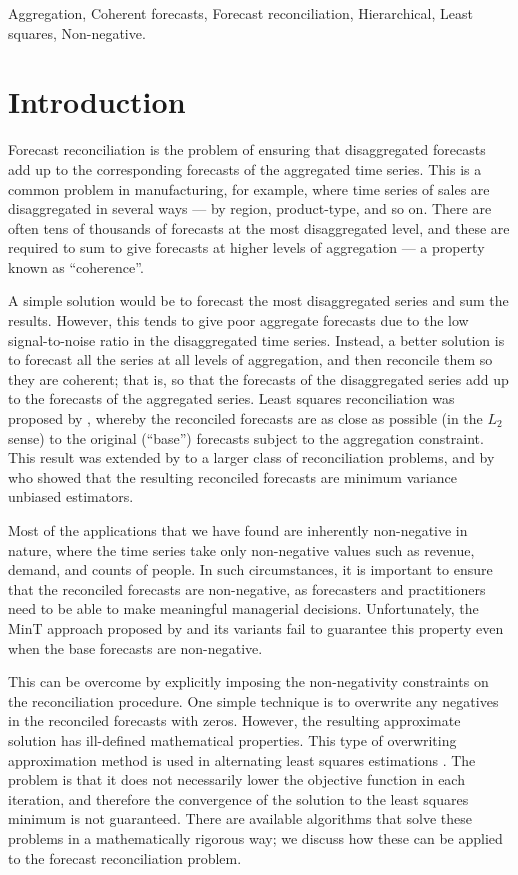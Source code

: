 \documentclass[11pt]{article}
\newcommand{\0}{\phantom{0}}
\begin{document}
\begin{keywords}
	Aggregation, Coherent forecasts, Forecast reconciliation, Hierarchical, Least squares, Non-negative.
\end{keywords}

\newpage

\section{Introduction}

Forecast reconciliation is the problem of ensuring that disaggregated forecasts add up to the corresponding forecasts of the aggregated time series. This is a common problem in manufacturing, for example, where time series of sales are disaggregated in several ways --- by region, product-type, and so on. There are often tens of thousands of forecasts at the most disaggregated level, and these are required to sum to give forecasts at higher levels of aggregation --- a property known as ``coherence''.

A simple solution would be to forecast the most disaggregated series and sum the results. However, this tends to give poor aggregate forecasts due to the low signal-to-noise ratio in the disaggregated time series. Instead, a better solution is to forecast all the series at all levels of aggregation, and then reconcile them so they are coherent; that is, so that the forecasts of the disaggregated series add up to the forecasts of the aggregated series. Least squares reconciliation was proposed by \citet{Hyndman2011}, whereby the reconciled forecasts are as close as possible (in the $L_2$ sense) to the original (``base'') forecasts subject to the aggregation constraint. This result was extended by \citet{Hyndman2016} to a larger class of reconciliation problems, and by \citet{Wick2018} who showed that the resulting reconciled forecasts are minimum variance unbiased estimators.

Most of the applications that we have found are inherently non-negative in nature, where the time series take only non-negative values such as revenue, demand, and counts of people. In such circumstances, it is important to ensure that the reconciled forecasts are non-negative, as forecasters and practitioners need to be able to make meaningful managerial decisions. Unfortunately, the MinT approach proposed by \citet{Wick2018} and its variants fail to guarantee this property even when the base forecasts are non-negative.

This can be overcome by explicitly imposing the non-negativity constraints on the reconciliation procedure. One simple technique is to overwrite any negatives in the reconciled forecasts with zeros. However, the resulting approximate solution has ill-defined mathematical properties. This type of overwriting approximation method is used in alternating least squares estimations \citep{Berry2007, Karjalainen1991}. The problem is that it does not necessarily lower the objective function in each iteration, and therefore the convergence of the solution to the least squares minimum is not guaranteed. There are available algorithms that solve these problems in a mathematically rigorous way; we discuss how these can be applied to the forecast reconciliation problem.
\end{document}
